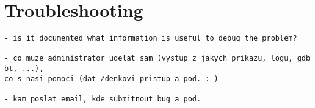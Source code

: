 \section{Troubleshooting}


\begin{verbatim}
- is it documented what information is useful to debug the problem?

- co muze administrator udelat sam (vystup z jakych prikazu, logu, gdb bt, ...), 
co s nasi pomoci (dat Zdenkovi pristup a pod. :-)

- kam poslat email, kde submitnout bug a pod.
\end{verbatim}
